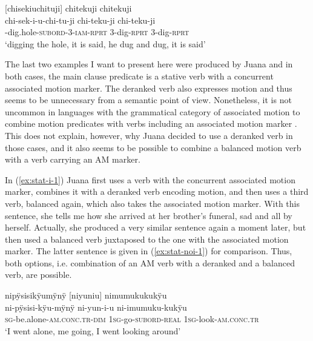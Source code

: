 \ea\label{ex:dig-dig}
\begingl
\glpreamble \textup{[}chisekiuchituji\textup{]} chitekuji chitekuji\\
\gla chi-sek-i-u-chi-tu-ji chi-teku-ji chi-teku-ji\\
-dig.hole-\textsc{subord}-3-\textsc{iam}-\textsc{rprt} 3-dig-\textsc{rprt} 3-dig-\textsc{rprt}\\
\glft ‘digging the hole, it is said, he dug and dug, it is said’
\endgl
\trailingcitation{[jmx-n120429ls-x5.163]}
\xe


The last two examples I want to present here were produced by Juana and in both cases, the main clause predicate is a stative verb with a concurrent associated motion marker. The deranked verb also expresses motion and thus seems to be unnecessary from a semantic point of view. Nonetheless, it is not uncommon in languages with the grammatical category of associated motion to combine motion predicates with verbs including an associated motion marker \citep[128]{Rose2015}. This does not explain, however, why Juana decided to use a deranked verb in those cases, and it also seems to be possible to combine a balanced motion verb with a verb carrying an AM marker.

In (\ref{ex:stat-i-1}) Juana first uses a verb with the concurrent associated motion marker, combines it with a deranked verb encoding motion, and then uses a third verb, balanced again, which also takes the associated motion marker. With this sentence, she tells me how she arrived at her brother’s funeral, sad and all by herself. Actually, she produced a very similar sentence again a moment later, but then used a balanced verb juxtaposed to the one with the associated motion marker. The latter sentence is given in (\ref{ex:stat-noi-1}) for comparison. Thus, both options, i.e. combination of an AM verb with a deranked and a balanced verb, are possible.

\ea\label{ex:stat-i-1}
\begingl
\glpreamble nipÿsisikÿumÿnÿ \textup{[}niyuniu\textup{]} nimumukukukÿu\\
\gla ni-pÿsisi-kÿu-mÿnÿ ni-yun-i-u ni-imumuku-kukÿu\\
\textsc{sg}-be.alone-\textsc{am.conc.tr}-\textsc{dim} 1\textsc{sg}-go-\textsc{subord}-\textsc{real} 1\textsc{sg}-look-\textsc{am.conc.tr}\\
\glft ‘I went alone, me going, I went looking around’
\endgl
\trailingcitation{[jxx-p120430l-2.248]}
\xe

